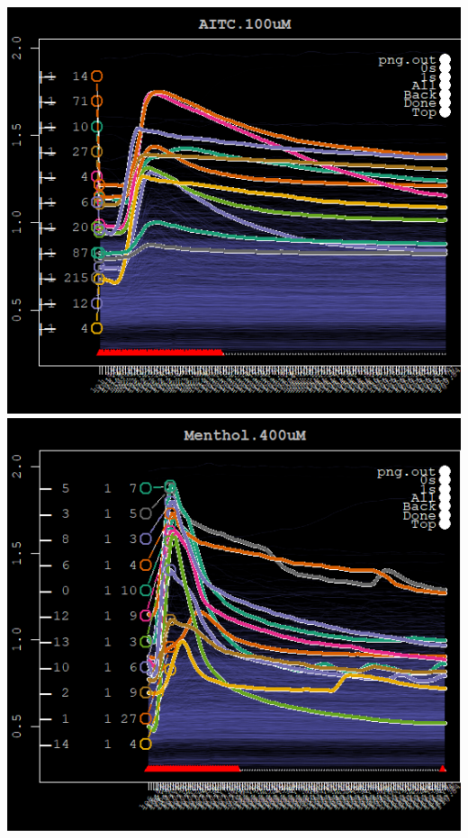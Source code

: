 \documentclass[11pt, fullpage,letterpaper]{article}
\begin{document}
\begin{enumerate}
\begin{enumerate}
\begin{center}
		\includegraphics[scale=.3]{AITC_img.png}\includegraphics[scale=.3]{MENTH_img.png}
		\newline

\end{center}
\end{enumerate}
\end{enumerate}
\end{document}
